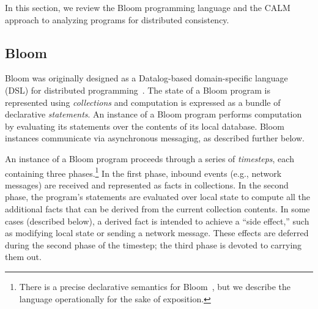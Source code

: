 In this section, we review the Bloom programming language and the CALM approach to analyzing programs for distributed consistency.

\subsection{Bloom}
\label{sec:bg-bloom}
Bloom was originally designed as a Datalog-based domain-specific language (DSL) for distributed
programming~\cite{Alvaro2011,bloom-website}. The state of a Bloom program is represented
using \emph{collections} and computation is expressed as a bundle of declarative
\emph{statements}.  An instance of a Bloom program performs computation by
evaluating its statements over the contents of its local database. Bloom
instances communicate via asynchronous messaging, as described further below.

An instance of a Bloom program proceeds through a series of \emph{timesteps},
each containing three phases.\footnote{There is a precise declarative semantics
  for Bloom~\cite{dedalus,Ameloot2011a}, but we describe the language
  operationally for the sake of exposition.} In the first phase, inbound events
(e.g., network messages) are received and represented as facts in
collections. In the second phase, the program's statements are evaluated over
local state to compute all the additional facts that can be derived from the
current collection contents. In some cases (described below), a derived fact is
intended to achieve a ``side effect,'' such as modifying local state or sending
a network message.  These effects are deferred during the second phase of the
timestep; the third phase is devoted to carrying them out.

